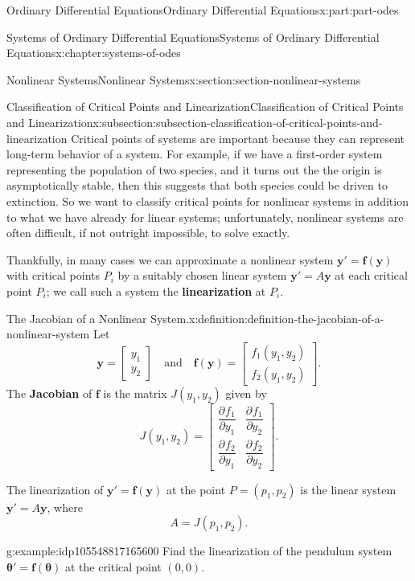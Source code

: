 \documentclass[twoside,10pt,]{book}
\newcommand{\terminology}[1]{\textbf{#1}}
\numberwithin{equation}{part}
\renewcommand{\vec}[1]{\mathbf{#1}}
\newcommand{\vecm}[1]{\bm{#1}}
\providecommand{\pdv}[3][]{\dfrac{\partial^{#1} #2}{\partial #3^{#1}}}
\renewcommand{\vecm}[1]{\boldsymbol{#1}}
\newcommand{\amp}{&}
\begin{document}
\begin{partptx}{Ordinary Differential Equations}{}{Ordinary Differential Equations}{}{}{x:part:part-odes}
\begin{chapterptx}{Systems of Ordinary Differential Equations}{}{Systems of Ordinary Differential Equations}{}{}{x:chapter:systems-of-odes}
\begin{sectionptx}{Nonlinear Systems}{}{Nonlinear Systems}{}{}{x:section:section-nonlinear-systems}
\begin{subsectionptx}{Classification of Critical Points and Linearization}{}{Classification of Critical Points and Linearization}{}{}{x:subsection:subsection-classification-of-critical-points-and-linearization}
Critical points of systems are important because they can represent long-term behavior of a system. For example, if we have a first-order system representing the population of two species, and it turns out the the origin is asymptotically stable, then this suggests that both species could be driven to extinction. So we want to classify critical points for nonlinear systems in addition to what we have already for linear systems; unfortunately, nonlinear systems are often difficult, if not outright impossible, to solve exactly.%
\par
Thankfully, in many cases we can approximate a nonlinear system \(\vec{y}' = \vec{f}(\vec{y})\) with critical points \(P_{i}\) by a suitably chosen linear system \(\vec{y}' = A\vec{y}\) at each critical point \(P_{i}\); we call such a system the \terminology{linearization} at \(P_{i}\).%
\begin{definition}{The Jacobian of a Nonlinear System.}{x:definition:definition-the-jacobian-of-a-nonlinear-system}%
Let%
\begin{equation*}
\vec{y} = \begin{bmatrix}y_{1} \\ y_{2}\end{bmatrix}\quad\text{and}\quad\vec{f}(\vec{y}) = \begin{bmatrix}f_{1}(y_{1},y_{2}) \\ f_{2}(y_{1},y_{2})\end{bmatrix}.
\end{equation*}
The \terminology{Jacobian} of \(\vec{f}\) is the matrix \(J(y_{1},y_{2})\) given by%
\begin{equation*}
J(y_{1},y_{2}) = \begin{bmatrix}\pdv{f_{1}}{y_{1}} \amp  \pdv{f_{1}}{y_{2}} \\ \pdv{f_{2}}{y_{1}} \amp  \pdv{f_{2}}{y_{2}}\end{bmatrix}.
\end{equation*}
%
\end{definition}
The linearization of \(\vec{y}' = \vec{f}(\vec{y})\) at the point \(P = (p_{1},p_{2})\) is the linear system \(\vec{y}' = A\vec{y}\), where%
\begin{equation*}
A = J(p_{1},p_{2}).
\end{equation*}
%
\begin{example}{}{g:example:idp105548817165600}%
Find the linearization of the pendulum system \(\vecm{\theta}' = \vec{f}(\vecm{\theta})\) at the critical point \((0,0)\).%
\par\smallskip%

\end{example}
\end{subsectionptx}
\end{sectionptx}
\end{chapterptx}
\end{partptx}
\end{document}
